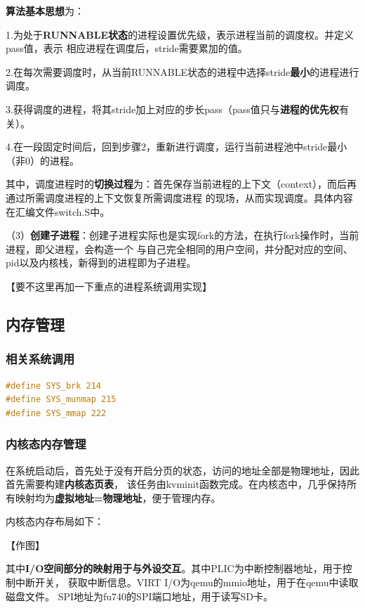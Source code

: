 \documentclass[UTF8,a4paper,10pt]{ctexart}
\begin{document}
  \textbf{算法基本思想}为：

1.为处于\textbf{RUNNABLE状态}的进程设置优先级，表示进程当前的调度权。并定义pass值，表示
相应进程在调度后，stride需要累加的值。

2.在每次需要调度时，从当前RUNNABLE状态的进程中选择stride\textbf{最小}的进程进行调度。

3.获得调度的进程，将其stride加上对应的步长pass（pass值只与\textbf{进程的优先权}有关）。

4.在一段固定时间后，回到步骤2，重新进行调度，运行当前进程池中stride最小（非0）的进程。

其中，调度进程时的\textbf{切换过程}为：首先保存当前进程的上下文（context），而后再通过所需调度进程的上下文恢复所需调度进程
的现场，从而实现调度。具体内容在汇编文件switch.S中。

（3）\textbf{创建子进程}：创建子进程实际也是实现fork的方法，在执行fork操作时，当前进程，即父进程，会构造一个
与自己完全相同的用户空间，并分配对应的空间、pid以及内核栈，新得到的进程即为子进程。

【要不这里再加一下重点的进程系统调用实现】

\subsection{内存管理}

\subsubsection{相关系统调用}

\begin{lstlisting}[title=内存管理系统调用,frame=trbl,language={C}]
#define SYS_brk 214
#define SYS_munmap 215
#define SYS_mmap 222
\end{lstlisting}

\subsubsection{内核态内存管理}

在系统启动后，首先处于没有开启分页的状态，访问的地址全部是物理地址，因此首先需要构建\textbf{内核态页表}，
该任务由kvminit函数完成。在内核态中，几乎保持所有映射均为\textbf{虚拟地址=物理地址}，便于管理内存。

内核态内存布局如下：

【作图】

其中\textbf{I/O空间部分的映射用于与外设交互}。其中PLIC为中断控制器地址，用于控制中断开关，
获取中断信息。VIRT I/O为qemu的mmio地址，用于在qemu中读取磁盘文件。
SPI地址为fu740的SPI端口地址，用于读写SD卡。
\end{document}
